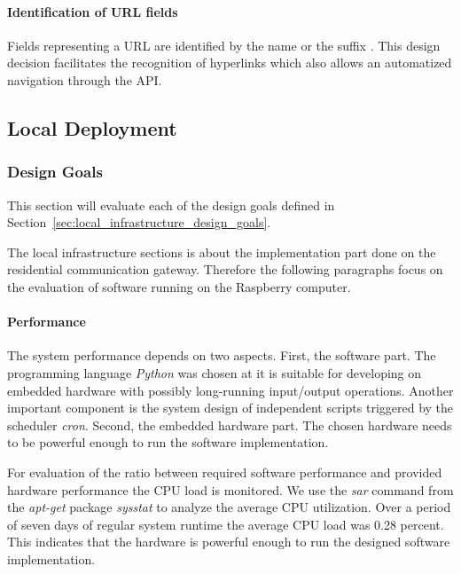 \paragraph{Identification of URL fields}

Fields representing a URL are identified by the name  or the suffix .
This design decision facilitates the recognition of hyperlinks which also allows an automatized navigation through the API.



\subsection{Local Deployment}


\subsubsection{Design Goals}

This section will evaluate each of the design goals defined in Section~\ref{sec:local_infrastructure_design_goals}.

The local infrastructure sections is about the implementation part done on the residential communication gateway.
Therefore the following paragraphs focus on the evaluation of software running on the Raspberry computer.

\paragraph{Performance}

The system performance depends on two aspects.
First, the software part.
The programming language \emph{Python} was chosen at it is suitable for developing on embedded hardware with possibly long-running input/output operations.
Another important component is the system design of independent scripts triggered by the scheduler \emph{cron}.
Second, the embedded hardware part.
The chosen hardware needs to be powerful enough to run the software implementation.

For evaluation of the ratio between required software performance and provided hardware performance the CPU load is monitored.
We use the \emph{sar} command from the \emph{apt-get} package \emph{sysstat} to analyze the average CPU utilization.
Over a period of seven days of regular system runtime the average CPU load was 0.28 percent.
This indicates that the hardware is powerful enough to run the designed software implementation.


